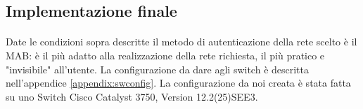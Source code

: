 \subsection{Implementazione finale}
\paragraph{} Date le condizioni sopra descritte il metodo di autenticazione della rete scelto è il MAB: è il più adatto alla realizzazione della rete richiesta, il più pratico e "invisibile" all'utente. 
La configurazione da dare agli switch è descritta nell'appendice \ref{appendix:swconfig}. La configurazione da noi creata è stata fatta su uno Switch Cisco Catalyst 3750, Version 12.2(25)SEE3.

